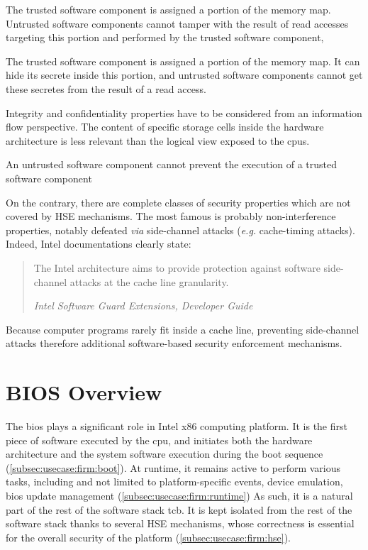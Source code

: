 \begin{definition}[Integrity]
  The trusted software component is assigned a portion of the memory map.
  Untrusted software components cannot tamper with the result of read accesses
  targeting this portion and performed by the trusted software component,
\end{definition}

\begin{definition}[Confidentiality]
  The trusted software component is assigned a portion of the memory map.
  It can hide its secrete inside this portion, and untrusted software components
  cannot get these secretes from the result of a read access.
\end{definition}

Integrity and confidentiality properties have to be considered from an
information flow perspective.
%
The content of specific storage cells inside the hardware architecture is less
relevant than the logical view exposed to the \acp{cpu}.

\begin{definition}[Availability]
  An untrusted software component cannot prevent the execution of a trusted
  software component
\end{definition}

On the contrary, there are complete classes of security properties which are not
covered by HSE mechanisms.
%
The most famous is probably non-interference properties, notably defeated
\emph{via} side-channel attacks (\emph{e.g.} cache-timing attacks). Indeed,
Intel documentations clearly state:

\begin{quote}
  The Intel architecture aims to provide protection against software
  side-channel attacks at the cache line granularity.

  \hfill\small \emph{Intel Software Guard Extensions, Developer Guide}
\end{quote}

Because computer programs rarely fit inside a cache line, preventing
side-channel attacks therefore additional software-based security enforcement
mechanisms.

\section{BIOS Overview}
\label{sec:usecase:firmware}

The \ac{bios} plays a significant role in Intel x86 computing platform.
%
It is the first piece of software executed by the \ac{cpu}, and initiates both
the hardware architecture and the system software execution during the boot
sequence (\ref{subsec:usecase:firm:boot}).
%
At runtime, it remains active to perform various tasks, including and not
limited to platform-specific events, device emulation, \ac{bios} update
management (\ref{subsec:usecase:firm:runtime})
%
As such, it is a natural part of the rest of the software stack \ac{tcb}.
%
It is kept isolated from the rest of the software stack thanks to several HSE
mechanisms, whose correctness is essential for the overall security of the
platform (\ref{subsec:usecase:firm:hse}).

